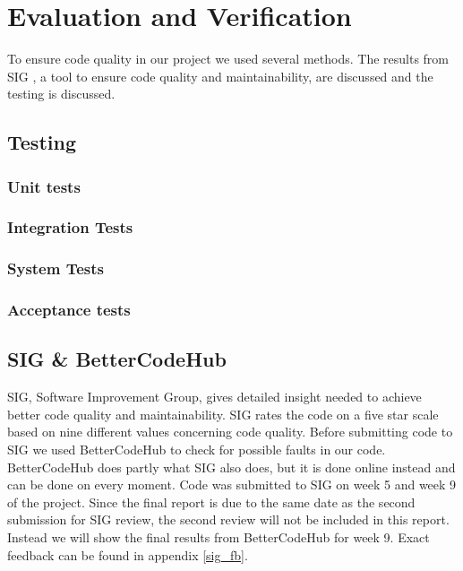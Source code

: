 \section{Evaluation and Verification} \label{eval_veri_results}

To ensure code quality in our project we used several methods. The results from SIG \cite{sig}, a tool to ensure code quality and maintainability, are discussed and the testing is discussed.

\subsection{Testing}

\subsubsection{Unit tests}

\subsubsection{Integration Tests}

\subsubsection{System Tests}

\subsubsection{Acceptance tests}



\subsection{SIG \& BetterCodeHub}
SIG, Software Improvement Group, gives detailed insight needed to achieve better code quality and maintainability. SIG rates the code on a five star scale based on nine different values concerning code quality. Before submitting code to SIG we used BetterCodeHub\cite{better_code_hub} to check for possible faults in our code. BetterCodeHub does partly what SIG also does, but it is done online instead and can be done on every moment. Code was submitted to SIG on week 5 and week 9 of the project. Since the final report is due to the same date as the second submission for SIG review, the second review will not be included in this report. Instead we will show the final results from BetterCodeHub for week 9. Exact feedback can be found in appendix \ref{sig_fb}.

